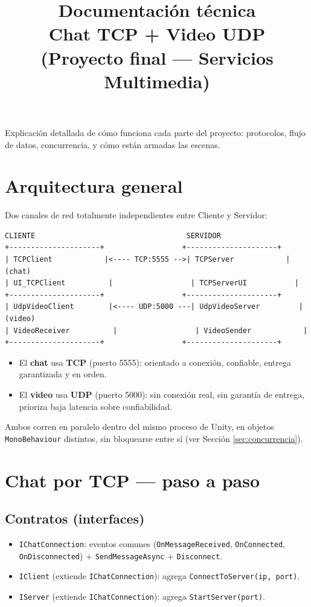 \documentclass[11pt,a4paper]{article}
\title{Documentación técnica \\ \large Chat TCP + Video UDP (Proyecto final — Servicios Multimedia)}
\author{}
\date{}
\begin{document}
\maketitle

Explicación detallada de cómo funciona cada parte del proyecto: protocolos,
flujo de datos, concurrencia, y cómo están armadas las escenas.

\tableofcontents

\section{Arquitectura general}

Dos canales de red totalmente independientes entre Cliente y Servidor:

\begin{lstlisting}
CLIENTE                                   SERVIDOR
+---------------------+                  +---------------------+
| TCPClient            |<---- TCP:5555 -->| TCPServer            |  (chat)
| UI_TCPClient          |                  | TCPServerUI           |
+---------------------+                  +---------------------+
| UdpVideoClient        |<---- UDP:5000 ---| UdpVideoServer         |  (video)
| VideoReceiver          |                  | VideoSender            |
+---------------------+                  +---------------------+
\end{lstlisting}

\begin{itemize}
  \item El \textbf{chat} usa \textbf{TCP} (puerto 5555): orientado a conexión, confiable, entrega garantizada y en orden.
  \item El \textbf{video} usa \textbf{UDP} (puerto 5000): sin conexión real, sin garantía de entrega, prioriza baja latencia sobre confiabilidad.
\end{itemize}

Ambos corren en paralelo dentro del mismo proceso de Unity, en objetos
\texttt{MonoBehaviour} distintos, sin bloquearse entre sí (ver Sección \ref{sec:concurrencia}).

\section{Chat por TCP — paso a paso}

\subsection{Contratos (interfaces)}
\begin{itemize}
  \item \texttt{IChatConnection}: eventos comunes (\texttt{OnMessageReceived}, \texttt{OnConnected}, \texttt{OnDisconnected}) + \texttt{SendMessageAsync} + \texttt{Disconnect}.
  \item \texttt{IClient} (extiende \texttt{IChatConnection}): agrega \texttt{ConnectToServer(ip, port)}.
  \item \texttt{IServer} (extiende \texttt{IChatConnection}): agrega \texttt{StartServer(port)}.
\end{itemize}
\end{document}
